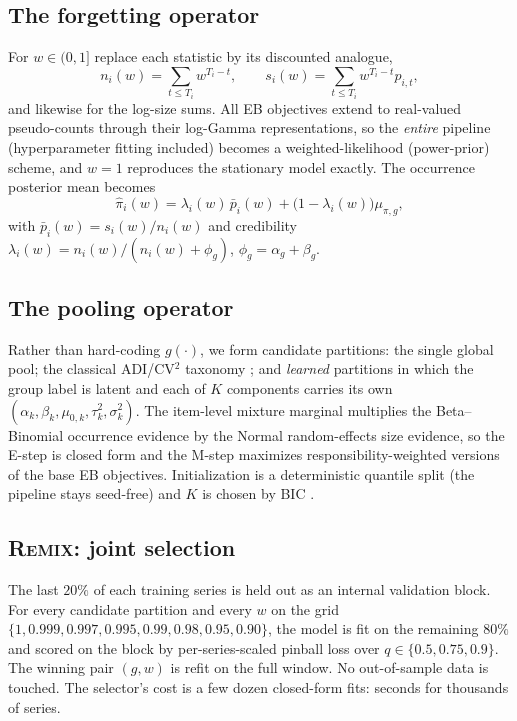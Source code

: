 \documentclass[twocolumn,10pt]{article}
\newcommand{\REMIX}{\textsc{Remix}}
\begin{document}
\subsection{The forgetting operator}\label{sec:discount}
For $w\in(0,1]$ replace each statistic by its discounted analogue,
\begin{equation}
n_i(w)=\!\sum_{t\le T_i}\! w^{T_i-t},\qquad
s_i(w)=\!\sum_{t\le T_i}\! w^{T_i-t} p_{i,t},
\label{eq:discounted-stats}
\end{equation}
and likewise for the log-size sums. All EB objectives extend to
real-valued pseudo-counts through their log-Gamma representations, so the
\emph{entire} pipeline (hyperparameter fitting included) becomes a
weighted-likelihood (power-prior) scheme, and $w{=}1$ reproduces the
stationary model exactly. The occurrence posterior mean becomes
\begin{equation}
\hat\pi_i(w)
=\lambda_i(w)\,\bar p_i(w)+\bigl(1-\lambda_i(w)\bigr)\mu_{\pi,g},
\label{eq:disc-post}
\end{equation}
with $\bar p_i(w)=s_i(w)/n_i(w)$ and credibility
$\lambda_i(w)=n_i(w)/(n_i(w)+\phi_g)$, $\phi_g=\alpha_g+\beta_g$.

\subsection{The pooling operator}\label{sec:mixture}
Rather than hard-coding $g(\cdot)$, we form candidate partitions:
the single global pool; the classical ADI/CV$^2$ taxonomy
\citep{syntetos2005categorization}; and \emph{learned} partitions in which
the group label is latent and each of $K$ components carries its own
$(\alpha_k,\beta_k,\mu_{0,k},\tau^2_k,\sigma^2_k)$. The item-level
mixture marginal multiplies the Beta--Binomial occurrence evidence by the
Normal random-effects size evidence, so the E-step is closed form and the
M-step maximizes responsibility-weighted versions of the base EB
objectives. Initialization is a deterministic quantile split (the
pipeline stays seed-free) and $K$ is chosen by BIC \citep{keribin2000}.

\subsection{\REMIX{}: joint selection}\label{sec:select}
The last $20\%$ of each training series is held out as an internal
validation block. For every candidate partition and every $w$ on the grid
$\{1,0.999,0.997,0.995,0.99,0.98,0.95,0.90\}$, the model is fit on the
remaining $80\%$ and scored on the block by per-series-scaled pinball loss
over $q\in\{0.5,0.75,0.9\}$. The winning pair $(g,w)$ is refit on the full
window. No out-of-sample data is touched. The selector's cost is a few
dozen closed-form fits: seconds for thousands of series.
\end{document}

